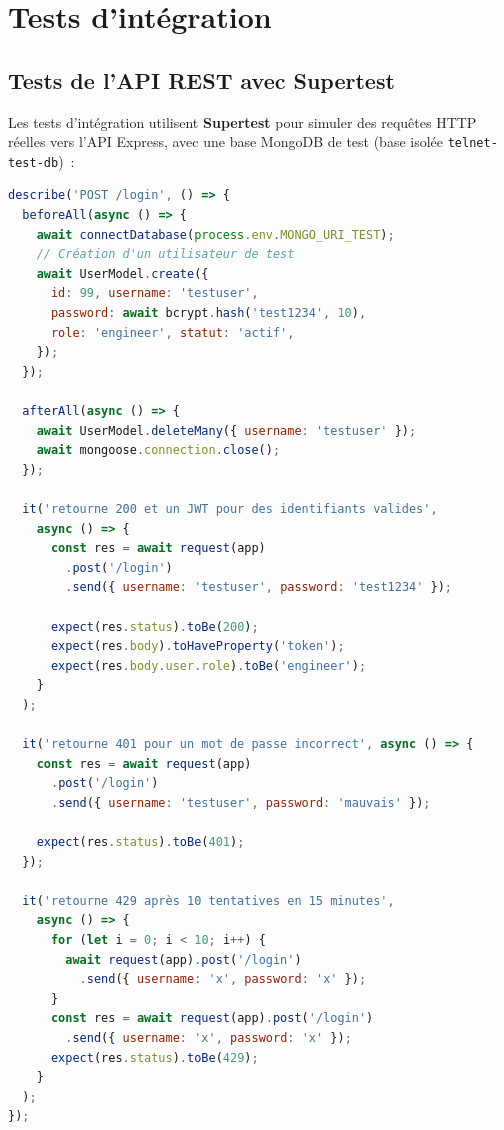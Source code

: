 \section{Tests d'intégration}

\subsection{Tests de l'API REST avec Supertest}

Les tests d'intégration utilisent \textbf{Supertest} pour simuler des
requêtes HTTP réelles vers l'API Express, avec une base MongoDB de test
(base isolée \texttt{telnet-test-db})~:

\begin{lstlisting}[language=javascript,
  caption={Tests d'intégration — Endpoint POST /login}]
describe('POST /login', () => {
  beforeAll(async () => {
    await connectDatabase(process.env.MONGO_URI_TEST);
    // Création d'un utilisateur de test
    await UserModel.create({
      id: 99, username: 'testuser',
      password: await bcrypt.hash('test1234', 10),
      role: 'engineer', statut: 'actif',
    });
  });

  afterAll(async () => {
    await UserModel.deleteMany({ username: 'testuser' });
    await mongoose.connection.close();
  });

  it('retourne 200 et un JWT pour des identifiants valides',
    async () => {
      const res = await request(app)
        .post('/login')
        .send({ username: 'testuser', password: 'test1234' });

      expect(res.status).toBe(200);
      expect(res.body).toHaveProperty('token');
      expect(res.body.user.role).toBe('engineer');
    }
  );

  it('retourne 401 pour un mot de passe incorrect', async () => {
    const res = await request(app)
      .post('/login')
      .send({ username: 'testuser', password: 'mauvais' });

    expect(res.status).toBe(401);
  });

  it('retourne 429 après 10 tentatives en 15 minutes',
    async () => {
      for (let i = 0; i < 10; i++) {
        await request(app).post('/login')
          .send({ username: 'x', password: 'x' });
      }
      const res = await request(app).post('/login')
        .send({ username: 'x', password: 'x' });
      expect(res.status).toBe(429);
    }
  );
});
\end{lstlisting}

